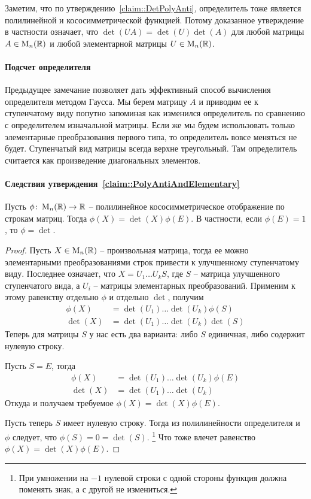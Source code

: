 Заметим, что по утверждению~\ref{claim::DetPolyAnti}, определитель тоже является полилинейной и кососимметрической функцией.
Потому доказанное утверждение в частности означает, что $\det(UA) = \det(U)\det(A)$ для любой матрицы $A\in\operatorname{M}_{n}(\mathbb R)$ и любой элементарной матрицы $U\in\operatorname{M}_{n}(\mathbb R)$.

\paragraph{Подсчет определителя}

Предыдущее замечание позволяет дать эффективный способ вычисления определителя методом Гаусса.
Мы берем матрицу $A$ и приводим ее к ступенчатому виду попутно запоминая как изменился определитель по сравнению с определителем изначальной матрицы.
Если же мы будем использовать только элементарные преобразования первого типа, то определитель вовсе меняться не будет.
Ступенчатый вид матрицы всегда верхне треугольный.
Там определитель считается как произведение диагональных элементов.


\paragraph{Следствия утверждения~\ref{claim::PolyAntiAndElementary}}

\begin{claim}\label{claim::PolyAntiUnique}
Пусть $\phi\colon \operatorname{M}_{n}(\mathbb R)\to \mathbb R$ -- полилинейное кососимметрическое отображение по строкам матриц.
Тогда $\phi(X) = \det(X)\phi(E)$.
В частности, если $\phi(E) = 1$, то $\phi = \det$.
\end{claim}
\begin{proof}
Пусть $X\in\operatorname{M}_{n}(\mathbb R)$ -- произвольная матрица, тогда ее можно элементарными преобразованиями строк привести к улучшенному ступенчатому виду.
Последнее означает, что $X = U_1 \ldots U_k S$, где $S$ -- матрица улучшенного ступенчатого вида, а $U_i$ -- матрицы элементарных преобразований.
Применим к этому равенству отдельно $\phi$ и отдельно $\det$, получим
\begin{align*}
\phi(X) &= \det(U_1)\ldots \det(U_k)\phi(S)\\
\det(X) &= \det(U_1)\ldots \det(U_k)\det(S)
\end{align*}
Теперь для матрицы $S$ у нас есть два варианта: либо $S$ единичная, либо содержит нулевую строку.

Пусть $S = E$, тогда
\begin{align*}
\phi(X) &= \det(U_1)\ldots \det(U_k)\phi(E)\\
\det(X) &= \det(U_1)\ldots \det(U_k)
\end{align*}
Откуда и получаем требуемое $\phi(X) = \det(X)\phi(E)$.

Пусть теперь $S$ имеет нулевую строку.
Тогда из полилинейности определителя и $\phi$ следует, что $\phi(S) = 0 =\det(S)$.%
\footnote{При умножении на $-1$ нулевой строки с одной стороны функция должна поменять знак, а с другой не измениться.}
Что тоже влечет равенство $\phi(X) = \det(X)\phi(E)$.
\end{proof}


